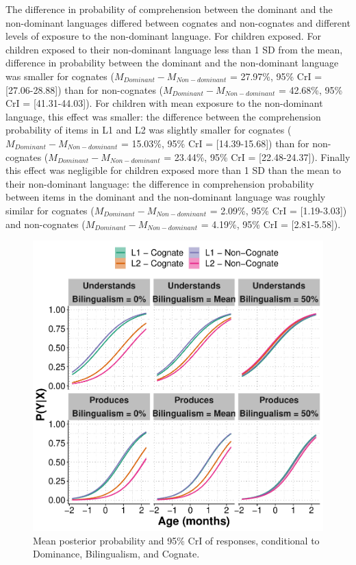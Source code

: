 \documentclass[
  english,
  man,man,floatsintext]{apa6}
\begin{document}
The difference in probability of comprehension between the dominant and the non-dominant languages differed between cognates and non-cognates and different levels of exposure to the non-dominant language. For children exposed. For children exposed to their non-dominant language less than 1 SD from the mean, difference in probability between the dominant and the non-dominant language was smaller for cognates (\(M_{Dominant}-M_{Non-dominant}\) = 27.97\%, 95\% CrI = {[}27.06-28.88{]}) than for non-cognates (\(M_{Dominant}-M_{Non-dominant}\) = 42.68\%, 95\% CrI = {[}41.31-44.03{]}). For children with mean exposure to the non-dominant language, this effect was smaller: the difference between the comprehension probability of items in L1 and L2 was slightly smaller for cognates (\(M_{Dominant}-M_{Non-dominant}\) = 15.03\%, 95\% CrI = {[}14.39-15.68{]}) than for non-cognates (\(M_{Dominant}-M_{Non-dominant}\) = 23.44\%, 95\% CrI = {[}22.48-24.37{]}). Finally this effect was negligible for children exposed more than 1 SD than the mean to their non-dominant language: the difference in comprehension probability between items in the dominant and the non-dominant language was roughly similar for cognates (\(M_{Dominant}-M_{Non-dominant}\) = 2.09\%, 95\% CrI = {[}1.19-3.03{]}) and non-cognates (\(M_{Dominant}-M_{Non-dominant}\) = 4.19\%, 95\% CrI = {[}2.81-5.58{]}).

\begin{figure}

{\centering \includegraphics[width=20cm]{trajectories_manuscript_files/figure-latex/marginalmeans-1} 

}

\caption{Mean posterior probability and 95\% CrI of responses, conditional to Dominance, Bilingualism, and Cognate.}\label{fig:marginalmeans}
\end{figure}
\end{document}
